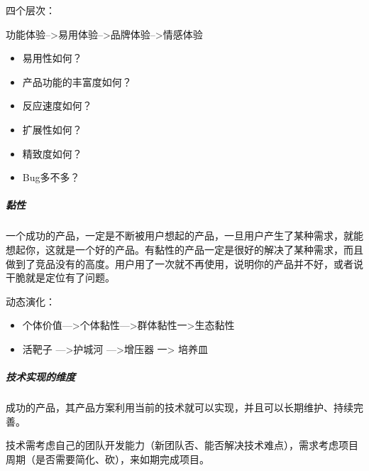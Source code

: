 \documentclass[letterpaper,11pt,english]{sphinxmanual}
\begin{document}
四个层次：%
\begin{footnote}[18]\sphinxAtStartFootnote
{}
%
\end{footnote}

功能体验–>易用体验–>品牌体验–>情感体验
\begin{itemize}
\item {} 
易用性如何？
%
\begin{footnote}[19]\sphinxAtStartFootnote
{}
%
\end{footnote}

\item {} 
产品功能的丰富度如何？

\item {} 
反应速度如何？

\item {} 
扩展性如何？

\item {} 
精致度如何？

\item {} 
Bug多不多？

\end{itemize}


\subparagraph{黏性}
\label{\detokenize{chapter_introduction/Product:id10}}
一个成功的产品，一定是不断被用户想起的产品，一旦用户产生了某种需求，就能想起你，这就是一个好的产品。有黏性的产品一定是很好的解决了某种需求，而且做到了竞品没有的高度。用户用了一次就不再使用，说明你的产品并不好，或者说干脆就是定位有了问题。

动态演化：
\begin{itemize}
\item {} 
个体价值—>个体黏性—>群体黏性一>生态黏性

\item {} 
活靶子 —>护城河 —>增压器 一> 培养皿

\end{itemize}


\subparagraph{技术实现的维度}
\label{\detokenize{chapter_introduction/Product:id11}}
成功的产品，其产品方案利用当前的技术就可以实现，并且可以长期维护、持续完善。

技术需考虑自己的团队开发能力（新团队否、能否解决技术难点），需求考虑项目周期（是否需要简化、砍），来如期完成项目。%
\begin{footnote}[20]\sphinxAtStartFootnote
{}
%
\end{footnote}
\end{document}
